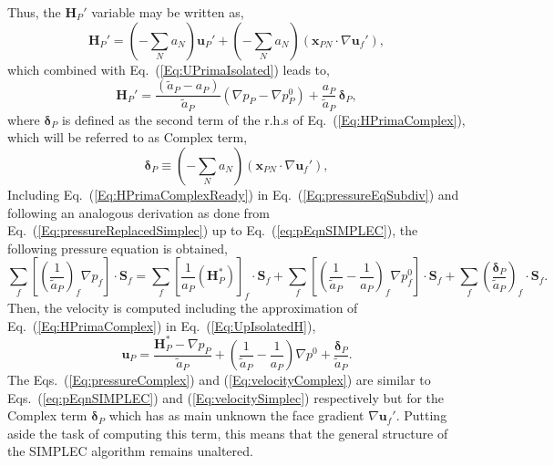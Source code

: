 \documentclass[final,3p,times,11pt,onecolumn]{myElsarticle}
\numberwithin{equation}{section}
\begin{document}
Thus, the $\boldsymbol{H}_P'$ variable may be written as,
\begin{equation}
\label{Eq:HPrimaComplex}
\boldsymbol{H}_P'
=
\left(
-\sum_N a_N
\right)
\boldsymbol{u}_P' 
+
\left(
-\sum_N a_N
\right)
\left(
\boldsymbol{x}_{PN}\cdot 
\nabla \boldsymbol{u}_f'
\right),
\end{equation}
which combined with Eq.~(\ref{Eq:UPrimaIsolated}) leads to,
\begin{equation}
\label{Eq:HPrimaComplexReady}
\boldsymbol{H}_P'
= 
\dfrac
{
\left(
\tilde{a}_P
-
a_P
\right)
}
{
\tilde{a}_P
}
\left(
\nabla p_P
-
\nabla p_P^{0}
\right)
+
\dfrac{a_P}{\tilde{a}_P}
\,
\boldsymbol{\delta}_P,
\end{equation}
where $\boldsymbol{\delta}_P$ is defined as the second term of the r.h.s of Eq.~(\ref{Eq:HPrimaComplex}), which will be referred to as Complex term,
\begin{equation}
\boldsymbol{\delta}_P 
\equiv 
\left(
-\sum_N a_N
\right)
\left(
\boldsymbol{x}_{PN}\cdot 
\nabla \boldsymbol{u}_f'
\right),
\end{equation}
Including Eq.~(\ref{Eq:HPrimaComplexReady}) in Eq.~(\ref{Eq:pressureEqSubdiv}) and following an analogous derivation as done from Eq.~(\ref{Eq:pressureReplacedSimplec}) up to Eq.~(\ref{eq:pEqnSIMPLEC}), the following pressure equation is obtained,
\begin{equation}
\label{Eq:pressureComplex}
\sum_f
\left[
\left(
\dfrac
{1}
{\tilde{a}_P}
\right)_f
\nabla p_f
\right]
\cdot 
\boldsymbol{S}_f
= 
\sum_f 
\left[
\frac{1}{a_P}
\left(
\boldsymbol{H}_P^*
\right)
\right]_f 
\cdot
\boldsymbol{S}_f
+
\sum_f
\left[
\left(
\dfrac
{1}
{\tilde{a}_P}
-
\dfrac
{1}
{a_P}
\right)_f
\nabla p^{0}_f
\right]
\cdot
\boldsymbol{S}_f
+
\sum_f
\left(
\dfrac{\boldsymbol{\delta}_P}{\tilde{a}_P}
\right)_f
\cdot
\boldsymbol{S}_f.
\end{equation}
Then, the velocity is computed including the approximation of Eq.~(\ref{Eq:HPrimaComplex}) in Eq.~(\ref{Eq:UpIsolatedH}),
\begin{equation}
\label{Eq:velocityComplex}
\boldsymbol{u}_P 
=
\dfrac
{
\boldsymbol{H}_P^*
- 
\nabla p_P}
{\tilde{a}_P}
+
\left(
\dfrac{1}
{\tilde{a}_P}
-
\dfrac{1}
{a_P}
\right)
\nabla p^{0}
+
\dfrac{\boldsymbol{\delta}_P}
{\tilde{a}_P}.
\end{equation}
The Eqs.~(\ref{Eq:pressureComplex}) and (\ref{Eq:velocityComplex}) are similar to Eqs.~(\ref{eq:pEqnSIMPLEC}) and (\ref{Eq:velocitySimplec}) respectively but for the Complex term $\boldsymbol{\delta}_P$ which has as main unknown the face gradient $\nabla \boldsymbol{u}_f'$. Putting aside the task of computing this term, this means that the general structure of the SIMPLEC algorithm remains unaltered. 
\end{document}
